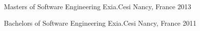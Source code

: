

\begin{cventries}

  \cventrythree
    {Masters of Software Engineering} %
    {Exia.Cesi} %
    {Nancy, France} %
    {2013} %
    
  \cventrythree
    {Bachelors of Software Engineering} %
    {Exia.Cesi} %
    {Nancy, France} %
    {2011} %

\end{cventries}
